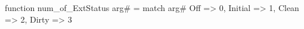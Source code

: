 function num_of_ExtStatus arg# = match arg# {
  Off => 0,
  Initial => 1,
  Clean => 2,
  Dirty => 3
}
